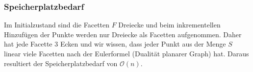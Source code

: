 \documentclass[a4paper]{article}
\begin{document}
\subsubsection*{Speicherplatzbedarf}

Im Initialzustand sind die Facetten $F$ Dreiecke und beim inkrementellen Hinzufügen der Punkte werden nur Dreiecke als Facetten aufgenommen. Daher hat jede Facette 3 Ecken und wir wissen, dass jeder Punkt aus der Menge $S$ linear viele Facetten nach der Eulerformel (Dualität planarer Graph) hat. Daraus resultiert der Speicherplatzbedarf von $\mathcal{O}(n)$.
\end{document}
